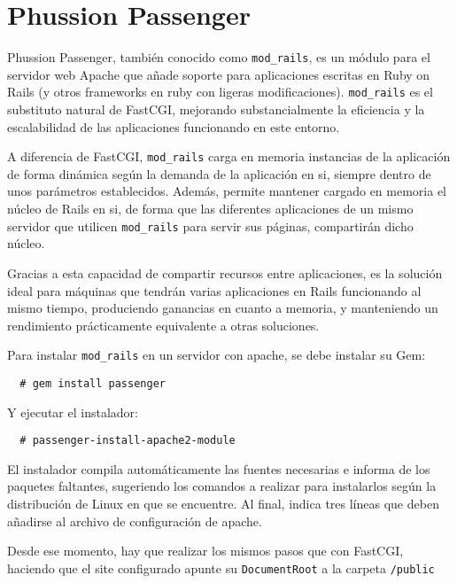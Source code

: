 
\section{Phussion Passenger} %
\label{sub:phussion_passenger}

Phussion Passenger, también conocido como \texttt{mod\_rails}, es un módulo para el servidor web Apache que añade soporte para aplicaciones escritas en Ruby on Rails (y otros frameworks en ruby con ligeras modificaciones). \texttt{mod\_rails} es el substituto natural de FastCGI, mejorando substancialmente la eficiencia y la escalabilidad de las aplicaciones funcionando en este entorno.

A diferencia de FastCGI, \texttt{mod\_rails} carga en memoria instancias de la aplicación de forma dinámica según la demanda de la aplicación en si, siempre dentro de unos parámetros establecidos. Además, permite mantener cargado en memoria el núcleo de Rails en si, de forma que las diferentes aplicaciones de un mismo servidor que utilicen \texttt{mod\_rails} para servir sus páginas, compartirán dicho núcleo.

Gracias a esta capacidad de compartir recursos entre aplicaciones, es la solución ideal para máquinas que tendrán varias aplicaciones en Rails funcionando al mismo tiempo, produciendo ganancias en cuanto a memoria, y manteniendo un rendimiento prácticamente equivalente a otras soluciones.

Para instalar \texttt{mod\_rails} en un servidor con apache, se debe instalar su Gem:

\begin{verbatim}
  # gem install passenger
\end{verbatim}

Y ejecutar el instalador:

\begin{verbatim}
  # passenger-install-apache2-module
\end{verbatim}

El instalador compila automáticamente las fuentes necesarias e informa de los paquetes faltantes, sugeriendo los comandos a realizar para instalarlos según la distribución de Linux en que se encuentre. Al final, indica tres líneas que deben añadirse al archivo de configuración de apache.

Desde ese momento, hay que realizar los mismos pasos que con FastCGI, haciendo que el site configurado apunte su \texttt{DocumentRoot} a la carpeta \texttt{/public}


